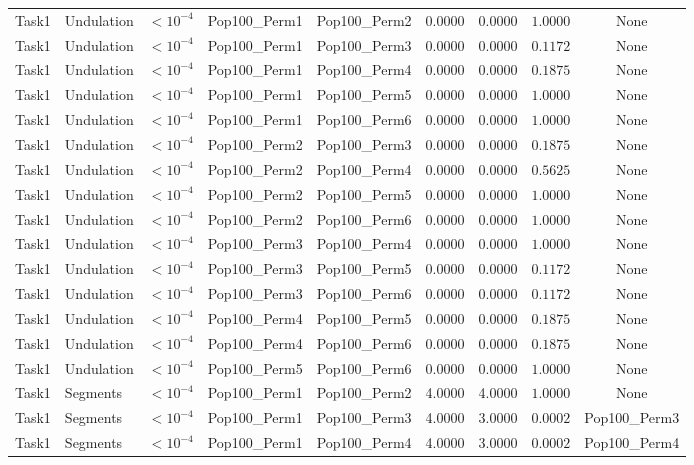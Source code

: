 \documentclass[8pt]{article}
\begin{document}
\begin{longtable}{llccccccc}
Task1 & Undulation & $< 10^{-4}$ & Pop100\_Perm1 & Pop100\_Perm2 & 0.0000 & 0.0000 & $1.0000$ & None \\
Task1 & Undulation & $< 10^{-4}$ & Pop100\_Perm1 & Pop100\_Perm3 & 0.0000 & 0.0000 & $0.1172$ & None \\
Task1 & Undulation & $< 10^{-4}$ & Pop100\_Perm1 & Pop100\_Perm4 & 0.0000 & 0.0000 & $0.1875$ & None \\
Task1 & Undulation & $< 10^{-4}$ & Pop100\_Perm1 & Pop100\_Perm5 & 0.0000 & 0.0000 & $1.0000$ & None \\
Task1 & Undulation & $< 10^{-4}$ & Pop100\_Perm1 & Pop100\_Perm6 & 0.0000 & 0.0000 & $1.0000$ & None \\
Task1 & Undulation & $< 10^{-4}$ & Pop100\_Perm2 & Pop100\_Perm3 & 0.0000 & 0.0000 & $0.1875$ & None \\
Task1 & Undulation & $< 10^{-4}$ & Pop100\_Perm2 & Pop100\_Perm4 & 0.0000 & 0.0000 & $0.5625$ & None \\
Task1 & Undulation & $< 10^{-4}$ & Pop100\_Perm2 & Pop100\_Perm5 & 0.0000 & 0.0000 & $1.0000$ & None \\
Task1 & Undulation & $< 10^{-4}$ & Pop100\_Perm2 & Pop100\_Perm6 & 0.0000 & 0.0000 & $1.0000$ & None \\
Task1 & Undulation & $< 10^{-4}$ & Pop100\_Perm3 & Pop100\_Perm4 & 0.0000 & 0.0000 & $1.0000$ & None \\
Task1 & Undulation & $< 10^{-4}$ & Pop100\_Perm3 & Pop100\_Perm5 & 0.0000 & 0.0000 & $0.1172$ & None \\
Task1 & Undulation & $< 10^{-4}$ & Pop100\_Perm3 & Pop100\_Perm6 & 0.0000 & 0.0000 & $0.1172$ & None \\
Task1 & Undulation & $< 10^{-4}$ & Pop100\_Perm4 & Pop100\_Perm5 & 0.0000 & 0.0000 & $0.1875$ & None \\
Task1 & Undulation & $< 10^{-4}$ & Pop100\_Perm4 & Pop100\_Perm6 & 0.0000 & 0.0000 & $0.1875$ & None \\
Task1 & Undulation & $< 10^{-4}$ & Pop100\_Perm5 & Pop100\_Perm6 & 0.0000 & 0.0000 & $1.0000$ & None \\
Task1 & Segments & $< 10^{-4}$ & Pop100\_Perm1 & Pop100\_Perm2 & 4.0000 & 4.0000 & $1.0000$ & None \\
Task1 & Segments & $< 10^{-4}$ & Pop100\_Perm1 & Pop100\_Perm3 & 4.0000 & 3.0000 & $0.0002$ & Pop100\_Perm3 \\
Task1 & Segments & $< 10^{-4}$ & Pop100\_Perm1 & Pop100\_Perm4 & 4.0000 & 3.0000 & $0.0002$ & Pop100\_Perm4 \\

\end{longtable}
\end{document}

